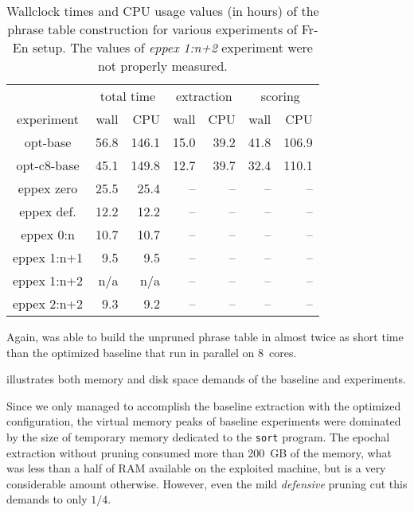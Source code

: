 \begin{table}[ht]
\centering
\begin{tabular}{ | c | r r | r r | r r | }
\hline
 & \multicolumn{2}{|c|}{total time} & \multicolumn{2}{|c|}{extraction} & \multicolumn{2}{|c|}{scoring} \\
experiment & wall & CPU & wall & CPU & wall & CPU \\
\hline
\hline
opt-base      & 56.8 & 146.1 & 15.0 & 39.2 & 41.8 & 106.9 \\
opt-c8-base   & 45.1 & 149.8 & 12.7 & 39.7 & 32.4 & 110.1 \\
eppex zero    & 25.5 &  25.4 & -- & -- & -- & -- \\
\hline
eppex def.    & 12.2 & 12.2 & -- & -- & -- & -- \\
eppex 0:n     & 10.7 & 10.7 & -- & -- & -- & -- \\
eppex 1:n+1   & 9.5 & 9.5 & -- & -- & -- & -- \\
eppex 1:n+2   & n/a & n/a & -- & -- & -- & -- \\
eppex 2:n+2   & 9.3 & 9.2 & -- & -- & -- & -- \\
\hline
\end{tabular}
\caption{\label{fr-en-time-benchmarks}
Wallclock times and CPU usage values (in hours) of the phrase table
construction for various experiments of Fr-En setup.
The values of \emph{eppex 1:n+2} experiment were not properly measured.}
\end{table}

Again, \eppex{} was able to build the unpruned phrase table in almost twice as short
time than the optimized baseline that run in parallel on 8~cores.

 illustrates both memory and disk space demands
of the baseline and \eppex{} experiments.

Since we only managed to accomplish the baseline extraction with the optimized
configuration, the virtual memory peaks of baseline experiments were dominated by
the size of temporary memory dedicated to the \texttt{sort} program.
The epochal extraction without pruning consumed more than 200~GB of the memory,
what was less than a half of RAM available on the exploited machine,
but is a very considerable amount otherwise.
However, even the mild \emph{defensive} pruning cut this demands to only $1/4$.


